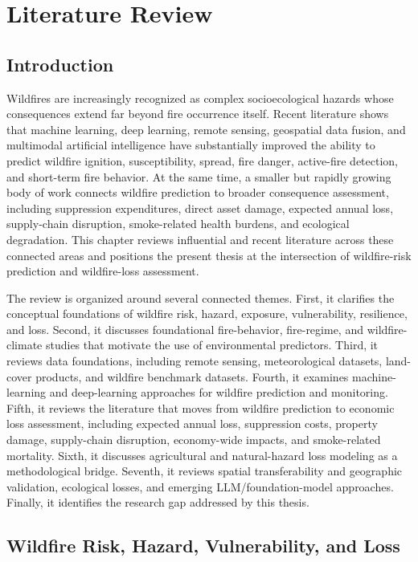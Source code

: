 \chapter{Literature Review}
\label{chap:litreview}

\section{Introduction}

Wildfires are increasingly recognized as complex socioecological hazards whose consequences extend far beyond fire occurrence itself. Recent literature shows that machine learning, deep learning, remote sensing, geospatial data fusion, and multimodal artificial intelligence have substantially improved the ability to predict wildfire ignition, susceptibility, spread, fire danger, active-fire detection, and short-term fire behavior. At the same time, a smaller but rapidly growing body of work connects wildfire prediction to broader consequence assessment, including suppression expenditures, direct asset damage, expected annual loss, supply-chain disruption, smoke-related health burdens, and ecological degradation. This chapter reviews influential and recent literature across these connected areas and positions the present thesis at the intersection of wildfire-risk prediction and wildfire-loss assessment.

The review is organized around several connected themes. First, it clarifies the conceptual foundations of wildfire risk, hazard, exposure, vulnerability, resilience, and loss. Second, it discusses foundational fire-behavior, fire-regime, and wildfire-climate studies that motivate the use of environmental predictors. Third, it reviews data foundations, including remote sensing, meteorological datasets, land-cover products, and wildfire benchmark datasets. Fourth, it examines machine-learning and deep-learning approaches for wildfire prediction and monitoring. Fifth, it reviews the literature that moves from wildfire prediction to economic loss assessment, including expected annual loss, suppression costs, property damage, supply-chain disruption, economy-wide impacts, and smoke-related mortality. Sixth, it discusses agricultural and natural-hazard loss modeling as a methodological bridge. Seventh, it reviews spatial transferability and geographic validation, ecological losses, and emerging LLM/foundation-model approaches. Finally, it identifies the research gap addressed by this thesis.

\section{Wildfire Risk, Hazard, Vulnerability, and Loss}

